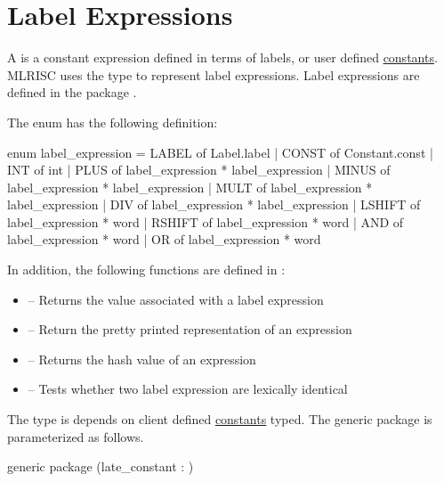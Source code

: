 \section{Label Expressions}

A  is a constant
expression defined in terms of labels, or user 
defined \href{constants.html}{constants}.  MLRISC uses the type
 to represent label expressions.  Label expressions
are defined in the package 
.

The enum  has the following definition:
\begin{SML}
  enum label_expression = 
      LABEL of Label.label
    | CONST of Constant.const
    | INT of int
    | PLUS of label_expression * label_expression
    | MINUS of label_expression * label_expression
    | MULT of label_expression * label_expression
    | DIV of label_expression * label_expression
    | LSHIFT of label_expression * word
    | RSHIFT of label_expression * word
    | AND of label_expression * word
    | OR of label_expression * word
\end{SML}

In addition, the following functions are defined in :
\begin{itemize}
  \item {}  -- Returns the value associated with
a label expression
  \item {} -- Return the pretty printed representation of an expression
  \item {} -- Returns the hash value of an expression
  \item {} -- Tests whether two label expression are lexically identical
\end{itemize}

The type  is depends on client defined 
\href{constants.html}{constants} typed.  The generic package 
is parameterized as follows.
\begin{SML}
   generic package (late_constant : )
\end{SML}
